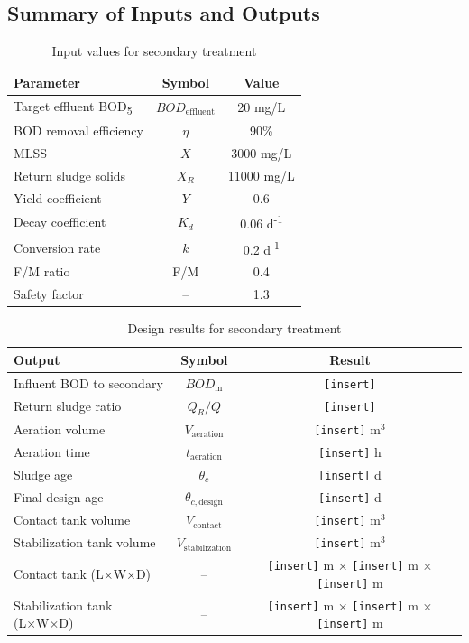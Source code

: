\documentclass[12pt]{article}
\begin{document}
\subsection*{Summary of Inputs and Outputs}

\begin{table}[h]
\centering
\caption{Input values for secondary treatment}
\label{tab:secondary_inputs}
\begin{tabular}{|l|c|c|}
\hline
\textbf{Parameter} & \textbf{Symbol} & \textbf{Value} \\
\hline
Target effluent BOD\textsubscript{5} & $BOD_{\text{effluent}}$ & 20 mg/L \\
BOD removal efficiency & $\eta$ & 90\% \\
MLSS & $X$ & 3000 mg/L \\
Return sludge solids & $X_R$ & 11000 mg/L \\
Yield coefficient & $Y$ & 0.6 \\
Decay coefficient & $K_d$ & 0.06 d\textsuperscript{-1} \\
Conversion rate & $k$ & 0.2 d\textsuperscript{-1} \\
F/M ratio & F/M & 0.4 \\
Safety factor & -- & 1.3 \\
\hline
\end{tabular}
\end{table}

\begin{table}[h]
\centering
\caption{Design results for secondary treatment}
\label{tab:secondary_results}
\begin{tabular}{|l|c|c|}
\hline
\textbf{Output} & \textbf{Symbol} & \textbf{Result} \\
\hline
Influent BOD to secondary & $BOD_{\text{in}}$ & \texttt{[insert]} \\
Return sludge ratio & $Q_R/Q$ & \texttt{[insert]} \\
Aeration volume & $V_{\text{aeration}}$ & \texttt{[insert]} m$^3$ \\
Aeration time & $t_{\text{aeration}}$ & \texttt{[insert]} h \\
Sludge age & $\theta_c$ & \texttt{[insert]} d \\
Final design age & $\theta_{c, \text{design}}$ & \texttt{[insert]} d \\
Contact tank volume & $V_{\text{contact}}$ & \texttt{[insert]} m$^3$ \\
Stabilization tank volume & $V_{\text{stabilization}}$ & \texttt{[insert]} m$^3$ \\
Contact tank (L×W×D) & -- & \texttt{[insert]} m × \texttt{[insert]} m × \texttt{[insert]} m \\
Stabilization tank (L×W×D) & -- & \texttt{[insert]} m × \texttt{[insert]} m × \texttt{[insert]} m \\
\hline
\end{tabular}
\end{table}
\end{document}
